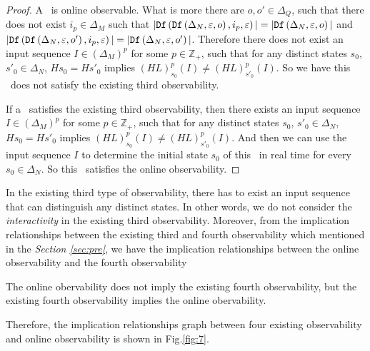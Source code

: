 \begin{proof}
A \BCN\ is online observable. What is more there are $o,o'\in\Delta_Q$, such that there does not exist $i_p \in \Delta_M$ such that $|{\tt Df}\left({\tt Df}\left(\Delta_N,\varepsilon, o\right),i_p,\varepsilon\right)|=|{\tt Df}\left(\Delta_N,\varepsilon, o\right)|$ and $|{\tt Df}\left({\tt Df}\left(\Delta_N,\varepsilon, o'\right),i_p,\varepsilon\right)|=|{\tt Df}\left(\Delta_N,\varepsilon, o'\right)|$. Therefore there does not exist an input sequence $I\in(\Delta_M)^p$ for some $p\in \mathbb{Z}_+$, such that for any distinct states $s_0$, ${s'}_0 \in \Delta_N$, $Hs_0=H{s'}_0$ implies $(HL)^p_{s_0}(I)\neq (HL)^p_{{s'}_0}(I)$. So we have this \BCN\ does not satisfy the existing third observability.

If a \BCN\ satisfies the existing third observability, then there exists an input sequence $I\in(\Delta_M)^p$ for some $p\in \mathbb{Z}_+$, such that for any distinct states $s_0$, ${s'}_0 \in \Delta_N$, $Hs_0=H{s'}_0$ implies $(HL)^p_{s_0}(I)\neq (HL)^p_{{s'}_0}(I)$. And then we can use the input sequence $I$ to determine the initial state $s_0$ of this \BCN\ in real time for every $s_0\in \Delta_N$. So this \BCN\ satisfies the online observability.
\end{proof}

In the existing third type of observability, there has to exist an input sequence that can distinguish any distinct states. In other words, we do not consider the {\em interactivity} in the existing third observability. Moreover, from the implication relationships between the existing third and fourth observability which mentioned in the {\em Section \ref{sec:pre}}, we have the implication relationships between the online observability and the fourth observability
\begin{theorem}
The online obervability does not imply the existing fourth observability, but the existing fourth observability implies the online obervability.
\label{theo:5}
\end{theorem}

Therefore, the implication relationships graph between four existing observability and online observability is shown in Fig.\ref{fig:7}.

